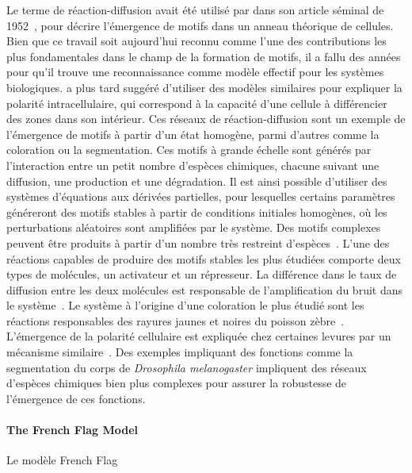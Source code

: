 {}{
Le terme de réaction-diffusion avait été utilisé par  dans son article séminal de 1952~\cite{turing1952chemical}, pour décrire l'émergence de motifs dans un anneau théorique de cellules. Bien que ce travail soit aujourd'hui reconnu comme l'une des contributions les plus fondamentales dans le champ de la formation de motifs, il a fallu des années pour qu'il trouve une reconnaissance comme modèle effectif pour les systèmes biologiques. \cite{gierer1972theory} a plus tard suggéré d'utiliser des modèles similaires pour expliquer la polarité intracellulaire, qui correspond à la capacité d'une cellule à différencier des zones dans son intérieur. Ces réseaux de réaction-diffusion sont un exemple de l'émergence de motifs à partir d'un état homogène, parmi d'autres comme la coloration ou la segmentation. Ces motifs à grande échelle sont générés par l'interaction entre un petit nombre d'espèces chimiques, chacune suivant une diffusion, une production et une dégradation. Il est ainsi possible d'utiliser des systèmes d'équations aux dérivées partielles, pour lesquelles certains paramètres généreront des motifs stables à partir de conditions initiales homogènes, où les perturbations aléatoires sont amplifiées par le système. Des motifs complexes peuvent être produits à partir d'un nombre très restreint d'espèces~\cite{kondo2010reaction}. L'une des réactions capables de produire des motifs stables les plus étudiées comporte deux types de molécules, un activateur et un répresseur. La différence dans le taux de diffusion entre les deux molécules est responsable de l'amplification du bruit dans le système~\cite{gierer1972theory}. Le système à l'origine d'une coloration le plus étudié sont les réactions responsables des rayures jaunes et noires du poisson zèbre~\cite{nakamasu2009interactions}. L'émergence de la polarité cellulaire est expliquée chez certaines levures par un mécanisme similaire~\cite{goryachev2008dynamics}. Des exemples impliquant des fonctions comme la segmentation du corps de \textit{Drosophila melanogaster} impliquent des réseaux d'espèces chimiques bien plus complexes pour assurer la robustesse de l'émergence de ces fonctions.
}


\paragraph{The French Flag Model}{Le modèle French Flag}

